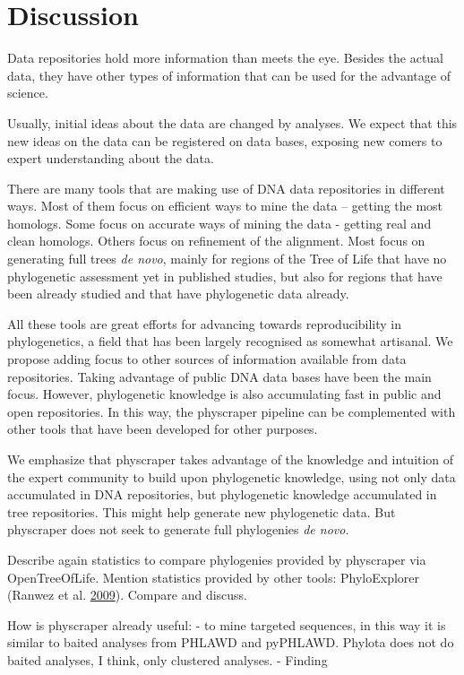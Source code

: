 \documentclass[]{article}
\begin{document}
\hypertarget{discussion}{%
\section{Discussion}\label{discussion}}

Data repositories hold more information than meets the eye.
Besides the actual data, they have other types of information that can be used for the advantage of science.

Usually, initial ideas about the data are changed by analyses.
We expect that this new ideas on the data can be registered on data bases,
exposing new comers to expert understanding about the data.

There are many tools that are making use of DNA data repositories in different ways.
Most of them focus on efficient ways to mine the data -- getting the most homologs.
Some focus on accurate ways of mining the data - getting real and clean homologs.
Others focus on refinement of the alignment.
Most focus on generating full trees \emph{de novo}, mainly for regions of the Tree of
Life that have no phylogenetic assessment yet in published studies, but also for
regions that have been already studied and that have phylogenetic data already.

All these tools are great efforts for advancing towards reproducibility in phylogenetics,
a field that has been largely recognised as somewhat artisanal.
We propose adding focus to other sources of information available from data repositories.
Taking advantage of public DNA data bases have been the main focus. However, phylogenetic knowledge is
also accumulating fast in public and open repositories.
In this way, the physcraper pipeline can be complemented with other tools that have
been developed for other purposes.

We emphasize that physcraper takes advantage of the knowledge and intuition of the expert
community to build upon phylogenetic knowledge, using not only data accumulated in
DNA repositories, but phylogenetic knowledge accumulated in tree repositories.
This might help generate new phylogenetic data. But physcraper does not seek to generate full phylogenies \emph{de novo}.

Describe again statistics to compare phylogenies provided by physcraper via OpenTreeOfLife.
Mention statistics provided by other tools: PhyloExplorer (Ranwez et al. \protect\hyperlink{ref-ranwez2009phyloexplorer}{2009}).
Compare and discuss.

How is physcraper already useful:
- to mine targeted sequences, in this way it is similar to baited analyses from PHLAWD and pyPHLAWD. Phylota does not do baited analyses, I think, only clustered analyses.
- Finding
\end{document}
